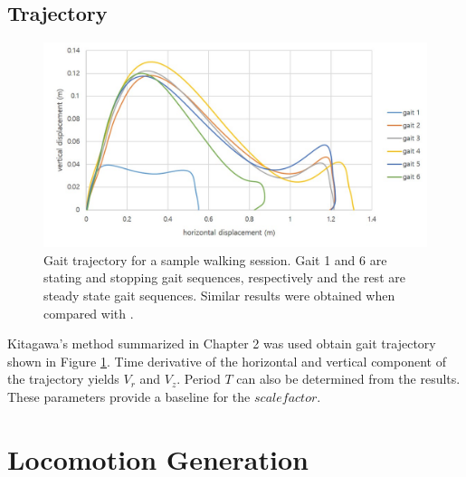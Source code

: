 \newpage
\subsection{Trajectory}

\begin{figure}[th]
\captionsetup{justification=raggedright,singlelinecheck=false}
\centering
\includegraphics[width=\textwidth,height=\textheight,keepaspectratio]{Figures/gait_feature_extraction_results.jpg}
\decoRule
\caption[Gait feature extraction results]{Gait trajectory for a sample walking session. Gait 1 and 6 are stating and stopping gait sequences, respectively and the rest are steady state gait sequences. Similar results were obtained when compared with \cite{Kit16}.}
\label{fig:gait_feature_extraction_results}
\end{figure}
\noindent
Kitagawa's method summarized in Chapter 2 was used obtain gait trajectory shown in Figure \ref{fig:gait_feature_extraction_results}. Time derivative of the horizontal and vertical component of the trajectory yields $V_{r}$ and $V_{z}$. Period $T$ can also be determined from the results. These parameters provide a baseline for the $scale factor$.

\newpage

\section{Locomotion Generation}


